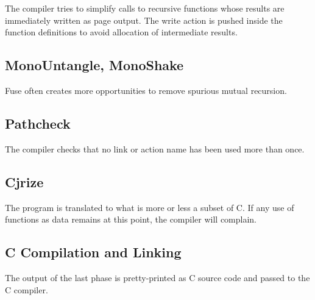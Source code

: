 \documentclass{article}
\begin{document}
The compiler tries to simplify calls to recursive functions whose results are immediately written as page output.  The write action is pushed inside the function definitions to avoid allocation of intermediate results.

\subsection{MonoUntangle, MonoShake}

Fuse often creates more opportunities to remove spurious mutual recursion.

\subsection{Pathcheck}

The compiler checks that no link or action name has been used more than once.

\subsection{Cjrize}

The program is translated to what is more or less a subset of C.  If any use of functions as data remains at this point, the compiler will complain.

\subsection{C Compilation and Linking}

The output of the last phase is pretty-printed as C source code and passed to the C compiler.
\end{document}
